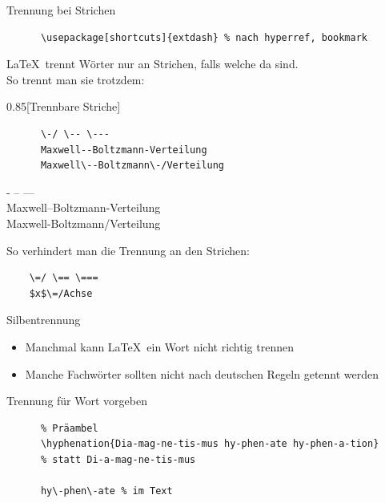 \begin{frame}[fragile]{
  Trennung bei Strichen \hfill
}
  \vspace*{-2em}
  \begin{Packages}
    \begin{lstlisting}
      \usepackage[shortcuts]{extdash} % nach hyperref, bookmark
    \end{lstlisting}
  \end{Packages}

  \LaTeX\ trennt Wörter nur an Strichen, falls welche da sind.\\
  So trennt man sie trotzdem:
  \vspace{-0.5em}
  \begin{CodeExample}{0.85}[Trennbare Striche]
    \begin{lstlisting}
      \-/ \-- \---
      Maxwell--Boltzmann-Verteilung
      Maxwell\--Boltzmann\-/Verteilung
    \end{lstlisting}
  \CodeResult
    - -- --- \\
    Maxwell--Boltzmann-Verteilung \\
    Maxwell\--Boltzmann\-/Verteilung
  \end{CodeExample}

  \vspace{-7em}
  So verhindert man die Trennung an den Strichen:
  \begin{lstlisting}
    \=/ \== \===
    $x$\=/Achse
  \end{lstlisting}
\end{frame}

\begin{frame}[fragile]{Silbentrennung}
  \begin{itemize}
    \item Manchmal kann \LaTeX\ ein Wort nicht richtig trennen
    \item Manche Fachwörter sollten nicht nach deutschen Regeln getennt werden
  \end{itemize}
  \begin{block}{Trennung für Wort vorgeben}
    \begin{lstlisting}
      % Präambel
      \hyphenation{Dia-mag-ne-tis-mus hy-phen-ate hy-phen-a-tion}
      % statt Di-a-mag-ne-tis-mus

      hy\-phen\-ate % im Text
    \end{lstlisting}
  \end{block}
\end{frame}
